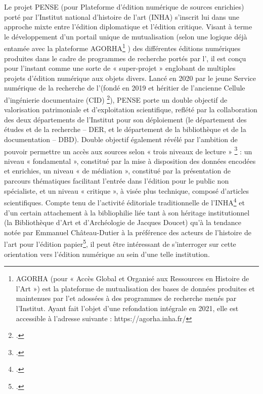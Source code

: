 Le projet PENSE (pour Plateforme d’édition numérique de sources enrichies) porté par l’Institut national d’histoire de l’art (INHA) s’inscrit lui dans une approche mixte entre l’édition diplomatique et l’édition critique. Visant à terme le développement d’un portail unique de mutualisation (selon une logique déjà entamée avec la plateforme AGORHA\footnote{AGORHA (pour « Accès Global et Organisé aux Ressources en Histoire de l’Art ») est la plateforme de mutualisation des bases de données produites et maintenues par l’\inha et adossées à des programmes de recherche menés par l’Institut. Ayant fait l’objet d’une refondation intégrale en 2021, elle est accessible à l’adresse suivante : https://agorha.inha.fr/}  ) des différentes éditions numériques produites dans le cadre de programmes de recherche portés par l’\inha, il est conçu pour l’instant comme une sorte de « super-projet » englobant de multiples projets d’édition numérique aux objets divers. Lancé en 2020 par le jeune Service numérique de la recherche de l’\inha (fondé en 2019 et héritier de l’ancienne Cellule d’ingénierie documentaire (CID) \footcite{inha_service_nodate}), PENSE porte un double objectif de valorisation patrimoniale et d’exploitation scientifique, reflété par la collaboration des deux départements de l’Institut pour son déploiement (le département des études et de la recherche – DER, et le département de la bibliothèque et de la documentation – DBD). Double objectif également révélé par l’ambition de pouvoir permettre un accès aux sources selon « trois niveaux de lecture » \footcite{inha_produire_nodate} : un niveau « fondamental », constitué par la mise à disposition des données encodées et enrichies, un niveau « de médiation », constitué par la présentation de parcours thématiques facilitant l’entrée dans l’édition pour le public non spécialiste, et un niveau « critique », à visée plus technique, composé d’articles scientifiques.
Compte tenu de l’activité éditoriale traditionnelle de l’INHA\footcite{inha_editions_nodate} et d’un certain attachement à la bibliophilie liée tant à son héritage institutionnel (la Bibliothèque d’Art et d’Archéologie de Jacques Doucet) qu’à la tendance notée par Emmanuel Château-Dutier à la préférence des acteurs de l’histoire de l’art pour l’édition papier\footcite[p.86]{chateau-dutier_editions_2021}, il peut être intéressant de s’interroger sur cette orientation vers l’édition numérique au sein d’une telle institution. 
